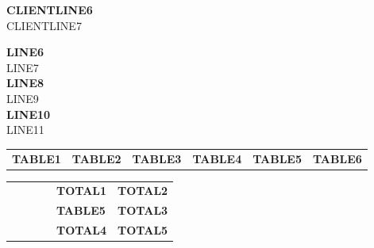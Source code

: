 \documentclass[a4paper]{article}
\newcommand{\lline}[2]{{\color{#1}\noindent\makebox[\linewidth][c]{\rule{1.02\textwidth}{#2}}}}
\begin{document}
    \vspace*{10pt} %
    \noindent
    \begin{minipage}[b]{0.5\textwidth}
        \vspace{0pt} %
        \begin{flushleft}
            \normalsize{\textbf{CLIENTLINE6}} \\
            \normalsize{CLIENTLINE7}
        \end{flushleft}
    \end{minipage}
    \hfill
    \begin{minipage}[b]{0.4\textwidth}
        \vspace{0pt} %
        \begin{flushright}
            \normalsize{\textbf{LINE6}} \\
            \normalsize{LINE7} \\
            \normalsize{\textbf{LINE8}} \\
            \normalsize{LINE9} \\
            \normalsize{\textbf{LINE10}} \\
            \normalsize{LINE11} \\
        \end{flushright}
    \end{minipage}

    \vspace*{20pt} %
    \noindent

    \begin{tabularx}{\linewidth}{
            >{\hsize=1.5\hsize}X
            >{\hsize=0.75\hsize}X
            >{\hsize=1\hsize}X
            >{\hsize=1\hsize}X
            >{\hsize=0.75\hsize}X
            >{\raggedleft\arraybackslash\hsize=1\hsize}X}
        \textbf{TABLE1} & \textbf{TABLE2} & \textbf{TABLE3} & \textbf{TABLE4} & \textbf{TABLE5} & \textbf{TABLE6}
    \end{tabularx}
    \vspace*{-10pt}
    \lline{blue}{0.8pt}

    \vspace*{10pt}

    \begin{tabularx}{\linewidth}{
            >{\hsize=1\hsize}X
            >{\hsize=1\hsize}X
            >{\hsize=1\hsize}X
            >{\hsize=1\hsize}X
            >{\raggedleft\arraybackslash\hsize=1\hsize}X
            >{\raggedleft\arraybackslash\hsize=1\hsize}X}
        &&&& \textbf{TOTAL1} & \textbf{TOTAL2} \\[2pt]
        &&&& \textbf{TABLE5} & \textbf{TOTAL3} \\[2pt]
        &&&& \textbf{TOTAL4} & \textbf{TOTAL5} \\[2pt]
    \end{tabularx}
\end{document}
